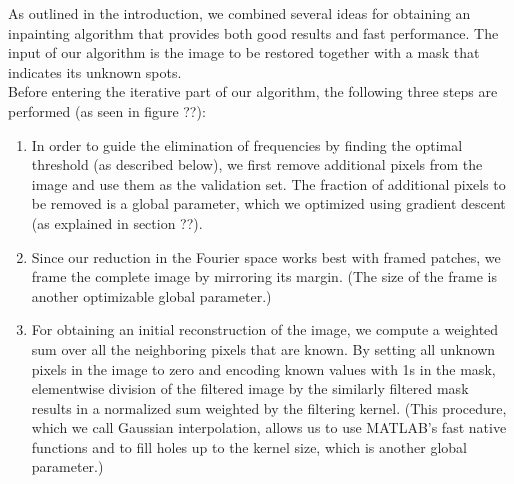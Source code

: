 \documentclass[10pt,conference,compsocconf]{IEEEtran}
\begin{document}
As outlined in the introduction, we combined several ideas for obtaining an inpainting algorithm that provides both good results and fast performance. The input of our algorithm is the image to be restored together with a mask that indicates its unknown spots.\\
Before entering the iterative part of our algorithm, the following three steps are performed (as seen in figure ??):
\begin{enumerate}
\item In order to guide the elimination of frequencies by finding the optimal threshold (as described below), we first remove additional pixels from the image and use them as the validation set. The fraction of additional pixels to be removed is a global parameter, which we optimized using gradient descent (as explained in section ??).
\item Since our reduction in the Fourier space works best with framed patches, we frame the complete image by mirroring its margin. (The size of the frame is another optimizable global parameter.)
\item For obtaining an initial reconstruction of the image, we compute a weighted sum over all the neighboring pixels that are known. By setting all unknown pixels in the image to zero and encoding known values with 1s in the mask, elementwise division of the filtered image by the similarly filtered mask results in a normalized sum weighted by the filtering kernel. (This procedure, which we call Gaussian interpolation, allows us to use MATLAB's fast native functions and to fill holes up to the kernel size, which is another global parameter.)
\end{enumerate}
\end{document}
